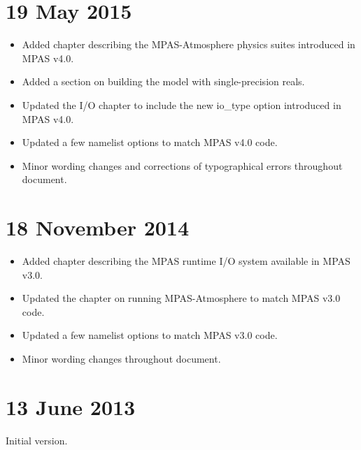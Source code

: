 \section*{19 May 2015}

\begin{itemize}
\item Added chapter describing the MPAS-Atmosphere physics suites introduced in MPAS v4.0.
\item Added a section on building the model with single-precision reals.
\item Updated the I/O chapter to include the new io\_type option introduced in MPAS v4.0.
\item Updated a few namelist options to match MPAS v4.0 code.
\item Minor wording changes and corrections of typographical errors throughout document.
\end{itemize}

\section*{18 November 2014}

\begin{itemize}
\item Added chapter describing the MPAS runtime I/O system available in MPAS v3.0.
\item Updated the chapter on running MPAS-Atmosphere to match MPAS v3.0 code.
\item Updated a few namelist options to match MPAS v3.0 code.
\item Minor wording changes throughout document.
\end{itemize}

\section*{13 June 2013}

Initial version.

